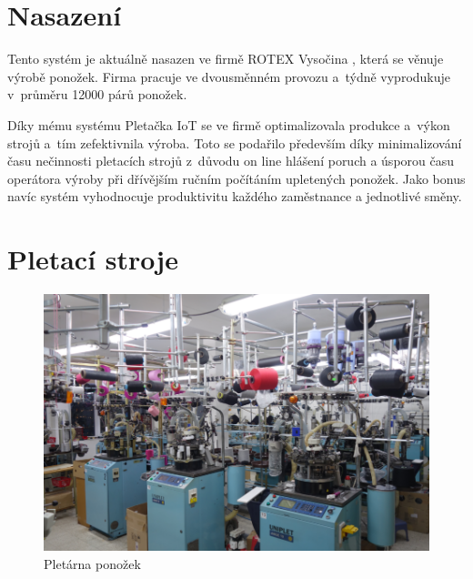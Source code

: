 \section{Nasazení}
Tento systém je aktuálně nasazen ve firmě ROTEX Vysočina \cite{ROTEX}, která se věnuje výrobě ponožek. 
Firma pracuje ve dvousměnném provozu a~týdně vyprodukuje v~průměru 12000 párů ponožek. 

Díky mému systému Pletačka IoT se ve firmě optimalizovala produkce a výkon strojů a tím zefektivnila výroba. 
Toto se podařilo především díky minimalizování času nečinnosti pletacích strojů z důvodu on line hlášení poruch a úsporou času operátora výroby při dřívějším ručním počítáním upletených ponožek. 
Jako bonus navíc systém vyhodnocuje produktivitu každého zaměstnance a jednotlivé směny.


\section{Pletací stroje}


\begin{figure}[htbp]
    \centering
    \includegraphics[width=\textwidth]{img/pletarna.png}
    \caption{Pletárna ponožek}
    \label{fig:Pletarna}
\end{figure}



\newpage